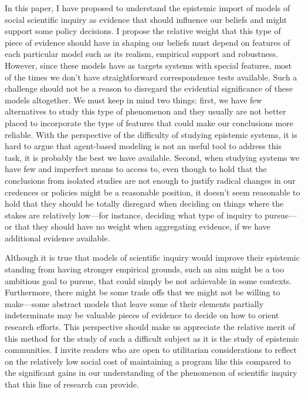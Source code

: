 \documentclass{article}
\begin{document}
In this paper, I have proposed to understand the epistemic import of models of social scientific inquiry as evidence that should influence our beliefs and might support some policy decisions. I propose the relative weight that this type of piece of evidence should have in shaping our beliefs must depend on features of each particular model such as its realism, empirical support and robustness. However, since these models have as targets systems with special features, most of the times we don't have straightforward correspondence tests available. Such a challenge should not be a reason to disregard the evidential significance of these models altogether. We must keep in mind two things: first, we have few alternatives to study this type of phenomenon and they usually are not better placed to incorporate the type of features that could make our conclusions more reliable. With the perspective of the difficulty of studying epistemic systems, it is hard to argue that agent-based modeling is not an useful tool to address this task, it is probably the best we have available. Second, when studying systems we have few and imperfect means to access to, even though to hold that the conclusions from isolated studies are not enough to justify radical changes in our credences or policies might be a reasonable position, it doesn't seem reasonable to hold that they should be totally disregard when deciding on things where the stakes are relatively low—for instance, deciding what type of inquiry to pursue—or that they should have no weight when aggregating evidence, if we have additional evidence available.

Although it is true that models of scientific inquiry would improve their epistemic standing from having stronger empirical grounds, such an aim might be a too ambitious goal to pursue, that could simply be not achievable in some contexts. Furthermore, there might be some trade offs that we might not be willing to make—some abstract models that leave some of their elements partially indeterminate may be valuable pieces of evidence to decide on how to orient research efforts. This perspective should make us appreciate the relative merit of this method for the study of such a difficult subject as it is the study of epistemic communities. I invite readers who are open to utilitarian considerations to reflect on the relatively low social cost of maintaining a program like this compared to the significant gains in our understanding of the phenomenon of scientific inquiry that this line of research can provide.
\end{document}
